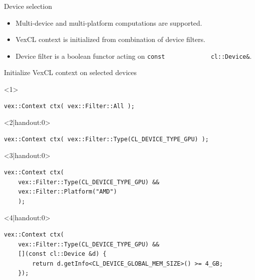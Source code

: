 \documentclass[@BEAMER_OPTIONS@]{beamer}
\newcommand{\code}[1]{\lstinline|#1|}
\begin{document}
\begin{frame}[fragile]{Device selection}
    \begin{itemize}
        \item Multi-device and multi-platform computations are supported.
        \item VexCL context is initialized from combination of device filters.
        \item Device filter is a boolean functor acting on \code{const
            cl::Device&}.
    \end{itemize}
    \vspace{-0.5\baselineskip}
    \begin{overlayarea}{\textwidth}{0.4\textheight}
    \begin{exampleblock}{Initialize VexCL context on selected devices}
        \begin{onlyenv}<1>
        \begin{lstlisting}
vex::Context ctx( vex::Filter::All );
        \end{lstlisting}
        \end{onlyenv}
        \begin{onlyenv}<2|handout:0>
        \begin{lstlisting}
vex::Context ctx( vex::Filter::Type(CL_DEVICE_TYPE_GPU) );
        \end{lstlisting}
        \end{onlyenv}
        \begin{onlyenv}<3|handout:0>
        \begin{lstlisting}
vex::Context ctx(
    vex::Filter::Type(CL_DEVICE_TYPE_GPU) &&
    vex::Filter::Platform("AMD")
    );
        \end{lstlisting}
        \end{onlyenv}
        \begin{onlyenv}<4|handout:0>
        \begin{lstlisting}
vex::Context ctx(
    vex::Filter::Type(CL_DEVICE_TYPE_GPU) &&
    [](const cl::Device &d) {
        return d.getInfo<CL_DEVICE_GLOBAL_MEM_SIZE>() >= 4_GB;
    });
        \end{lstlisting}
        \end{onlyenv}
    \end{exampleblock}
    \end{overlayarea}
    \begin{figure}
\end{figure}
\end{frame}
\end{document}
